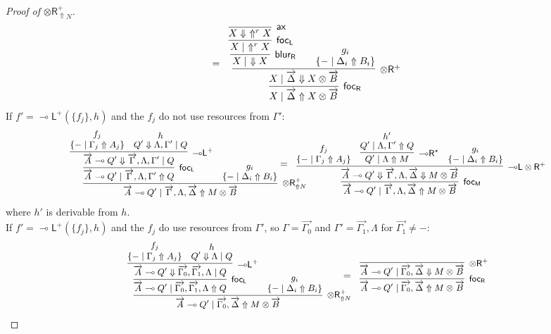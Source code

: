 \documentclass[runningheads]{llncs}
\renewcommand{\vec}{\overrightarrow}
\newcommand{\tr}{\otimes \mathsf{R}}
\newcommand{\lright}{{\multimap}\mathsf{R}}
\newcommand{\lleft}{{\multimap}\mathsf{L}}
\newcommand{\otR}{\tr}
\newcommand{\lolliR}{\lright}
\newcommand{\lolliL}{\lleft}
\newcommand{\ax}{\mathsf{ax}}
\newcommand{\ot}{\otimes}
\newcommand{\lolli}{\multimap}
\newcommand{\proofbox}[1]{\begin{tabular}{l} #1 \end{tabular}}
\newcommand{\up}{\Uparrow}
\newcommand{\dn}{\Downarrow}
\newcommand{\focL}{\mathsf{foc_L}}
\newcommand{\focR}{\mathsf{foc_R}}
\newcommand{\blurR}{\mathsf{blur_R}}
\newcommand{\focLR}{\mathsf{foc_{M}}}
\begin{document}
\begin{proof}[Proof of $\tr_{\up N}^+$]
\[{{     }
   }
   =
   \proofbox{
     \infer[\focR]{X \mid \vec{\Delta} \up X \ot \vec{B}}{
       \infer[\otR^+]{X \mid \vec{\Delta} \dn X \ot \vec{B}}{
         \infer[\blurR]{X \mid ~ \dn X}{
           \infer[\focL]{X \mid ~ \up^r X}{
             \infer[\ax]{X \dn ~ \up^r X}{}
           }
         } &
     &
     \deduce{\{ - \mid \Delta_i \up B_i\}}{g_i}          
       }
     }
   }
   \]
    If $f' = \lolliL^+(\{f_j\},h)$ and the $f_j$ do not use resources from $\Gamma'$:
    \[\footnotesize
    \proofbox{
      \infer[\tr_{\up N}^+]{\vec{A} \lolli Q' \mid \vec{\Gamma},\Lambda,\vec{\Delta} \up M \ot \vec{B}}{
        \infer[\focL]{\vec{A} \lolli Q' \mid \vec{\Gamma},\Lambda,\Gamma' \up Q}{
          \infer[\lolliL^+]{\vec{A} \lolli Q' \dn \vec{\Gamma},\Lambda,\Gamma' \mid Q}{
          \deduce{\{ - \mid \Gamma_j \up A_j\}}{f_j}
          &
          \deduce{Q' \dn \Lambda,\Gamma' \mid Q}{h}
          }
        }
      &
      \deduce{\{ - \mid \Delta_i \up B_i\}}{g_i}
      }
    }
    \hspace{-1.257 cm}
    =
    \proofbox{
      \infer[\focLR]{\vec{A} \lolli Q' \mid \vec{\Gamma},\Lambda,\vec{\Delta} \up M \ot \vec{B}}{
        \infer[\lolliL\otR^+]{\vec{A} \lolli Q' \dn \vec{\Gamma}, \Lambda, \vec{\Delta} \dn M \ot \vec{B}}{
          \deduce{\{ - \mid \Gamma_j \up A_j\}}{f_j}
          &
          \infer[\lolliR^{\star}]{Q' \mid \Lambda \up M}{
            \deduce{Q' \mid \Lambda,\Gamma' \up Q}{h'}
          }
          &
          \deduce{\{ - \mid \Delta_i \up B_i\}}{g_i}
        }
      }
    }
    \]
    where $h'$ is derivable from $h$.
    \\If $f' = \lolliL^+(\{f_j\},h)$ and the $f_j$ do use resources from $\Gamma'$, so $\Gamma = \vec{\Gamma_0}$ and $\Gamma' = \vec{\Gamma_1},\Lambda$ for $\vec{\Gamma_1} \not= -$:
    \[\footnotesize
    \proofbox{
      \infer[\tr_{\up N}^+]{\vec{A} \lolli Q' \mid \vec{\Gamma_0},\vec{\Delta} \up M \ot \vec{B}}{
        \infer[\focL]{\vec{A} \lolli Q' \mid \vec{\Gamma_0},\vec{\Gamma_1},\Lambda \up Q}{
          \infer[\lolliL^+]{\vec{A} \lolli Q' \dn \vec{\Gamma_0},\vec{\Gamma_1},\Lambda \mid Q}{
          \deduce{\{ - \mid \Gamma_j \up A_j\}}{f_j}
          &
          \deduce{Q' \dn \Lambda \mid Q}{h}
          }
        }
      &
      \deduce{\{ - \mid \Delta_i \up B_i\}}{g_i}
      }
    }
    \hspace{-.6cm}
    =
   \proofbox{
     \infer[\focR]{\vec{A} \lolli Q' \mid \vec{\Gamma_0},\vec{\Delta} \up M \ot \vec{B}}{
       \infer[\otR^+]{\vec{A} \lolli Q' \mid \vec{\Gamma_0},\vec{\Delta} \dn M \ot \vec{B}}{
}}}\]
\end{proof}
\end{document}
